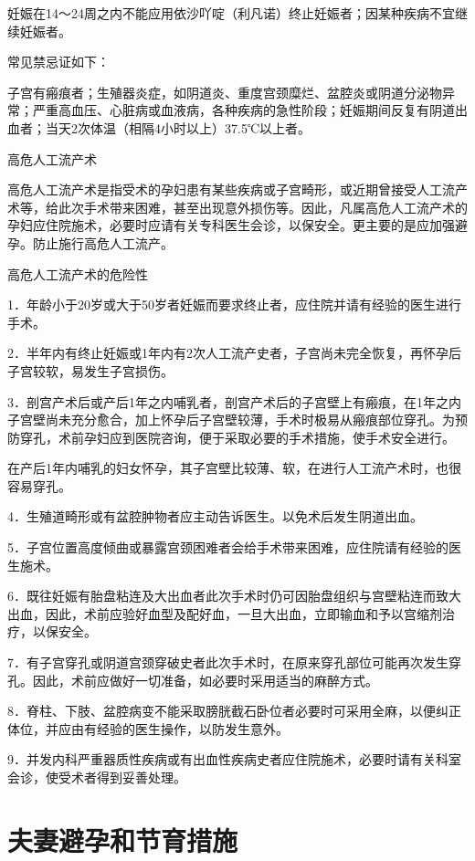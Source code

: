 \documentclass[12pt,UTF8,openany]{ctexbook}
\begin{document}
妊娠在14～24周之内不能应用依沙吖啶（利凡诺）终止妊娠者；因某种疾病不宜继续妊娠者。

常见禁忌证如下：

子宫有瘢痕者；生殖器炎症，如阴道炎、重度宫颈糜烂、盆腔炎或阴道分泌物异常；严重高血压、心脏病或血液病，各种疾病的急性阶段；妊娠期间反复有阴道出血者；当天2次体温（相隔4小时以上）37.5℃以上者。





高危人工流产术


高危人工流产术是指受术的孕妇患有某些疾病或子宫畸形，或近期曾接受人工流产术等，给此次手术带来困难，甚至出现意外损伤等。因此，凡属高危人工流产术的孕妇应住院施术，必要时应请有关专科医生会诊，以保安全。更主要的是应加强避孕。防止施行高危人工流产。

高危人工流产术的危险性

1．年龄小于20岁或大于50岁者妊娠而要求终止者，应住院并请有经验的医生进行手术。

2．半年内有终止妊娠或1年内有2次人工流产史者，子宫尚未完全恢复，再怀孕后子宫较软，易发生子宫损伤。

3．剖宫产术后或产后1年之内哺乳者，剖宫产术后的子宫壁上有瘢痕，在1年之内子宫壁尚未充分愈合，加上怀孕后子宫壁较薄，手术时极易从瘢痕部位穿孔。为预防穿孔，术前孕妇应到医院咨询，便于采取必要的手术措施，使手术安全进行。

在产后1年内哺乳的妇女怀孕，其子宫壁比较薄、软，在进行人工流产术时，也很容易穿孔。

4．生殖道畸形或有盆腔肿物者应主动告诉医生。以免术后发生阴道出血。

5．子宫位置高度倾曲或暴露宫颈困难者会给手术带来困难，应住院请有经验的医生施术。

6．既往妊娠有胎盘粘连及大出血者此次手术时仍可因胎盘组织与宫壁粘连而致大出血，因此，术前应验好血型及配好血，一旦大出血，立即输血和予以宫缩剂治疗，以保安全。

7．有子宫穿孔或阴道宫颈穿破史者此次手术时，在原来穿孔部位可能再次发生穿孔。因此，术前应做好一切准备，如必要时采用适当的麻醉方式。

8．脊柱、下肢、盆腔病变不能采取膀胱截石卧位者必要时可采用全麻，以便纠正体位，并应由有经验的医生操作，以防发生意外。

9．并发内科严重器质性疾病或有出血性疾病史者应住院施术，必要时请有关科室会诊，使受术者得到妥善处理。





\part{夫妻避孕和节育措施}
\end{document}
